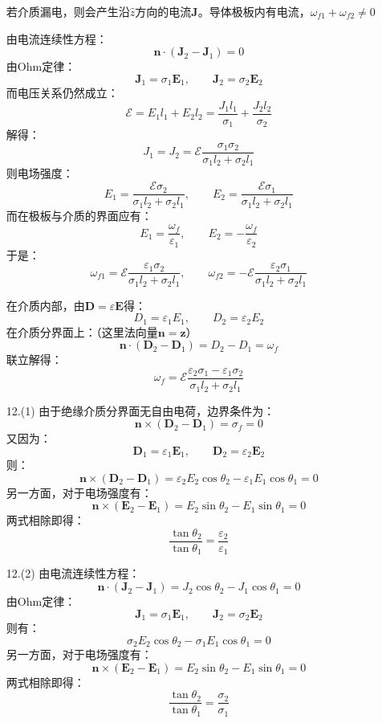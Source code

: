 \documentclass[a4paper,fontset=none]{ctexart}
\begin{document}
\begin{itemize}
        \textparagraph 若介质漏电，则会产生沿$\hat{z}$方向的电流$\bm{J}$。导体极板内有电流，$\omega_{f1} + \omega_{f2} \neq 0$

        由电流连续性方程：
        \[
            \bm{n}\cdot(\bm{J}_2 - \bm{J}_1) = 0
        \]
        由Ohm定律：
        \[
            \bm{J}_1 = \sigma_1\bm{E}_1,\qquad \bm{J}_2 = \sigma_2\bm{E}_2
        \]
        而电压关系仍然成立：
        \[
            \mathscr{E} = E_1 l_1 + E_2 l_2 = \frac{J_1 l_1}{\sigma_1} + \frac{J_2 l_2}{\sigma_2}
        \]
        解得：
        \[
            J_1 = J_2 = \mathscr{E}\frac{\sigma_1 \sigma_2}{\sigma_1 l_2 + \sigma_2 l_1}
        \]
        则电场强度：
        \[
            E_1 = \frac{\mathscr{E}\sigma_2}{\sigma_1 l_2 + \sigma_2 l_1},\qquad E_2 = \frac{\mathscr{E}\sigma_1}{\sigma_1 l_2 + \sigma_2 l_1}
        \]
        而在极板与介质的界面应有：
        \[
            E_1 = \frac{\omega_f}{\varepsilon_1},\qquad E_2 = -\frac{\omega_f}{\varepsilon_2}
        \]
        于是：
        \[
            \omega_{f1} = \mathscr{E}\frac{\varepsilon_1 \sigma_2}{\sigma_1 l_2 + \sigma_2 l_1},\qquad \omega_{f2} = -\mathscr{E}\frac{\varepsilon_2 \sigma_1}{\sigma_1 l_2 + \sigma_2 l_1}
        \]

        \textparagraph 在介质内部，由$\bm{D} = \varepsilon\bm{E}$得：
        \[
            D_1 = \varepsilon_1 E_1,\qquad D_2 = \varepsilon_2 E_2
        \]
        在介质分界面上：（这里法向量$\bm{n} = \bm{z}$）
        \[
            \bm{n}\cdot(\bm{D}_2 - \bm{D}_1) = D_2 - D_1 = \omega_f
        \]
        联立解得：
        \[
            \omega_f = \mathscr{E}\frac{\varepsilon_2 \sigma_1 - \varepsilon_1 \sigma_2}{\sigma_1 l_2 + \sigma_2 l_1}
        \]

        \item[12.(1)]
        由于绝缘介质分界面无自由电荷，边界条件为：
        \[
            \bm{n}\times(\bm{D}_2 - \bm{D}_1) = \sigma_f = 0
        \]
        又因为：
        \[
            \bm{D}_1 = \varepsilon_1\bm{E}_1,\qquad \bm{D}_2 = \varepsilon_2\bm{E}_2
        \]
        则：
        \[
            \bm{n}\times(\bm{D}_2 - \bm{D}_1) = \varepsilon_2 E_2\cos\theta_2 - \varepsilon_1 E_1\cos\theta_1 = 0
        \]
        另一方面，对于电场强度有：
        \[
            \bm{n}\times(\bm{E}_2 - \bm{E}_1) = E_2\sin\theta_2 - E_1\sin\theta_1 = 0
        \]
        两式相除即得：
        \[
            \frac{\tan\theta_2}{\tan\theta_1} = \frac{\varepsilon_2}{\varepsilon_1}
        \]

        \item[12.(2)]
        由电流连续性方程：
        \[
            \bm{n}\cdot(\bm{J}_2 - \bm{J}_1) = J_2\cos\theta_2 - J_1\cos\theta_1 = 0
        \]
        由Ohm定律：
        \[
            \bm{J}_1 = \sigma_1\bm{E}_1,\qquad \bm{J}_2 = \sigma_2\bm{E}_2
        \]
        则有：
        \[
            \sigma_2 E_2\cos\theta_2 - \sigma_1 E_1\cos\theta_1 = 0
        \]
        另一方面，对于电场强度有：
        \[
            \bm{n}\times(\bm{E}_2 - \bm{E}_1) = E_2\sin\theta_2 - E_1\sin\theta_1 = 0
        \]
        两式相除即得：
        \[
            \frac{\tan\theta_2}{\tan\theta_1} = \frac{\sigma_2}{\sigma_1}
        \]


\end{itemize}
\end{document}
